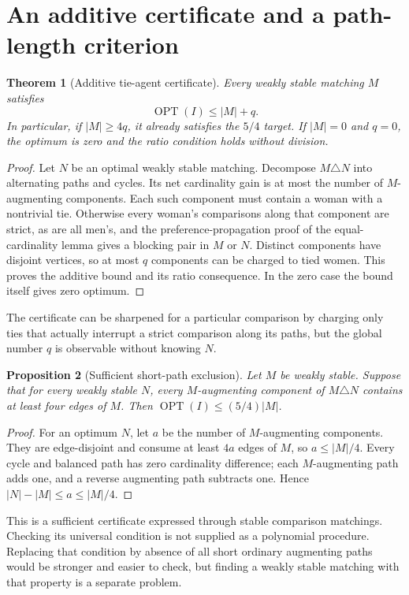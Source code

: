 \documentclass[11pt,a4paper]{article}
\newtheorem{theorem}{Theorem}[section]
\newtheorem{proposition}[theorem]{Proposition}
\theoremstyle{definition}
\theoremstyle{remark}
\begin{document}
\section{An additive certificate and a path-length criterion}
\begin{theorem}[Additive tie-agent certificate]
Every weakly stable matching $M$ satisfies
\[
 \operatorname{OPT}(I)\le |M|+q.
\]
In particular, if $|M|\ge4q$, it already satisfies the $5/4$ target. If $|M|=0$ and $q=0$, the optimum is zero and the ratio condition holds without division.
\end{theorem}
\begin{proof}
Let $N$ be an optimal weakly stable matching. Decompose $M\triangle N$ into alternating paths and cycles. Its net cardinality gain is at most the number of $M$-augmenting components. Each such component must contain a woman with a nontrivial tie. Otherwise every woman's comparisons along that component are strict, as are all men's, and the preference-propagation proof of the equal-cardinality lemma gives a blocking pair in $M$ or $N$. Distinct components have disjoint vertices, so at most $q$ components can be charged to tied women. This proves the additive bound and its ratio consequence. In the zero case the bound itself gives zero optimum.
\end{proof}

The certificate can be sharpened for a particular comparison by charging only ties that actually interrupt a strict comparison along its paths, but the global number $q$ is observable without knowing $N$.

\begin{proposition}[Sufficient short-path exclusion]
Let $M$ be weakly stable. Suppose that for every weakly stable $N$, every $M$-augmenting component of $M\triangle N$ contains at least four edges of $M$. Then $\operatorname{OPT}(I)\le(5/4)|M|$.
\end{proposition}
\begin{proof}
For an optimum $N$, let $a$ be the number of $M$-augmenting components. They are edge-disjoint and consume at least $4a$ edges of $M$, so $a\le|M|/4$. Every cycle and balanced path has zero cardinality difference; each $M$-augmenting path adds one, and a reverse augmenting path subtracts one. Hence $|N|-|M|\le a\le|M|/4$.
\end{proof}

This is a sufficient certificate expressed through stable comparison matchings. Checking its universal condition is not supplied as a polynomial procedure. Replacing that condition by absence of all short ordinary augmenting paths would be stronger and easier to check, but finding a weakly stable matching with that property is a separate problem.
\end{document}
